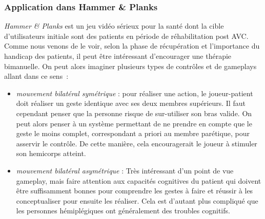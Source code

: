 		\subsubsection*{Application dans Hammer \& Planks}
\emph{Hammer \& Planks} est un jeu vidéo sérieux pour la santé dont la cible d'utilisateurs initiale sont des patients en période de réhabilitation post AVC. Comme nous venons de le voir, selon la phase de récupération et l'importance du handicap des patients, il peut être intéressant d'encourager une thérapie bimanuelle. On peut alors imaginer plusieurs types de contrôles et de gameplays allant dans ce sens~:
\begin{itemize}
	\item \emph{mouvement bilatéral symétrique} : pour réaliser une action, le joueur-patient doit réaliser un geste identique avec ses deux membres supérieurs. Il faut cependant penser que la personne risque de sur-utiliser son bras valide. On peut alors penser à un système permettant de ne prendre en compte que le geste le moins complet, correspondant a priori au membre parétique, pour asservir le contrôle. De cette manière, cela encouragerait le joueur à stimuler son \gls{hemicorps} atteint.
	\item \emph{mouvement bilatéral asymétrique} : Très intéressant d'un point de vue gameplay, mais faire attention aux capacités cognitives du patient qui doivent être suffisamment bonnes pour comprendre les gestes à faire et réussir à les conceptualiser pour ensuite les réaliser. Cela est d'autant plus compliqué que les personnes hémiplégiques ont généralement des troubles cognitifs.
\end{itemize}